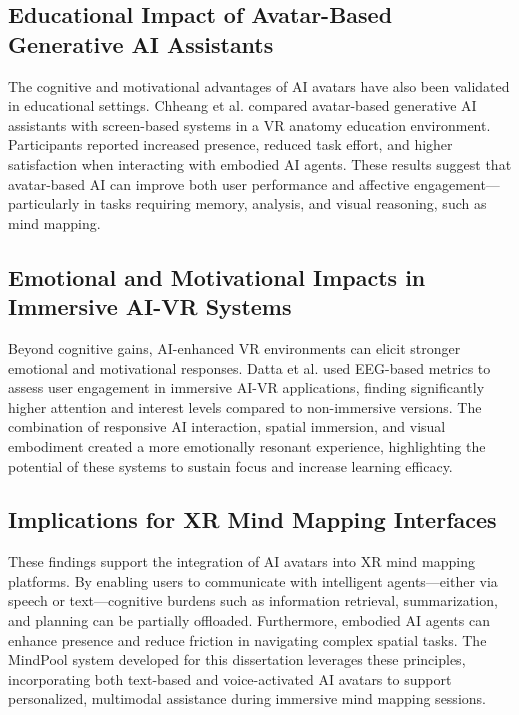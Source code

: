 \documentclass{CPP}
\begin{document}
\subsection{Educational Impact of Avatar-Based Generative AI Assistants}

The cognitive and motivational advantages of AI avatars have also been validated in educational settings. Chheang et al. \citep{Chheang2024} compared avatar-based generative AI assistants with screen-based systems in a VR anatomy education environment. Participants reported increased presence, reduced task effort, and higher satisfaction when interacting with embodied AI agents. These results suggest that avatar-based AI can improve both user performance and affective engagement—particularly in tasks requiring memory, analysis, and visual reasoning, such as mind mapping.

\subsection{Emotional and Motivational Impacts in Immersive AI-VR Systems}

Beyond cognitive gains, AI-enhanced VR environments can elicit stronger emotional and motivational responses. Datta et al. \citep{Datta2024} used EEG-based metrics to assess user engagement in immersive AI-VR applications, finding significantly higher attention and interest levels compared to non-immersive versions. The combination of responsive AI interaction, spatial immersion, and visual embodiment created a more emotionally resonant experience, highlighting the potential of these systems to sustain focus and increase learning efficacy.

\subsection{Implications for XR Mind Mapping Interfaces}

These findings support the integration of AI avatars into XR mind mapping platforms. By enabling users to communicate with intelligent agents—either via speech or text—cognitive burdens such as information retrieval, summarization, and planning can be partially offloaded. Furthermore, embodied AI agents can enhance presence and reduce friction in navigating complex spatial tasks. The MindPool system developed for this dissertation leverages these principles, incorporating both text-based and voice-activated AI avatars to support personalized, multimodal assistance during immersive mind mapping sessions.
\end{document}
